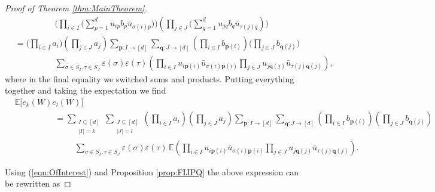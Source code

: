 \documentclass[11pt, a4paper, oneside, reqno]{amsart}
\theoremstyle{remark}
\theoremstyle{definition}
\numberwithin{equation}{section}
\begin{document}
\begin{proof}[Proof of Theorem \ref{thm:MainTheorem}]
\begin{align*}
	 & \hspace{2cm} \Big(\prod_{i \in I}\Big(\sum_{p=1}^d u_{ip}b_p\bar{u}_{\sigma(i)p}\Big)\Big)(\prod_{j \in J}\Big(\sum_{q=1}^d u_{jq}b_q\bar{u}_{\tau(j)q})\Big)                                                     \\
	 & = \Big(\prod_{i\in I}a_{i}\Big)(\prod_{j\in J}a_{j})\sum_{\mathbf{p}: I \to [d]}\sum_{\mathbf{q}: J \to [d]}(\prod_{i \in I}b_{\mathbf{p}(i)})\Big(\prod_{j \in J}b_{\mathbf{q}(j)}\Big)                        \\
	 & \hspace{2cm} \sum_{\sigma \in S_I, \tau \in S_J} \varepsilon(\sigma)\varepsilon(\tau) (\prod_{i \in I} u_{i\mathbf{p}(i)}\bar{u}_{\sigma(i)\mathbf{p}(i)}\prod_{j \in J}u_{j\mathbf{q}(j)}\bar{u}_{\tau(j)\mathbf{q}(j)}),
\end{align*}
where in the final equality we switched sums and products. Putting everything together and taking the expectation we find
\begin{align*}
	 & \mathbb{E}\bigl[e_k(W) e_{l}(W)\bigr] \nonumber                                                                                                                                                                    \\
	 & \hspace{2cm}= \sum_{\substack{I \subseteq [d]                                                                                                                                                                                                    \\ |I| = k}} \sum_{\substack{J \subseteq [d]\\ |J| = l}} (\prod_{i\in I}a_{i})(\prod_{j\in J}a_{j}) \sum_{\mathbf{p}: I \to [d]}\sum_{\mathbf{q}: J \to [d]}(\prod_{i \in I}b_{\mathbf{p}(i)})(\prod_{j \in J}b_{\mathbf{q}(j)}) \nonumber\\
	 & \hspace{3cm} \sum_{\sigma \in S_I, \tau \in S_J} \varepsilon(\sigma)\varepsilon(\tau)\, \mathbb{E}(\prod_{i \in I} u_{i\mathbf{p}(i)}\bar{u}_{\sigma(i)\mathbf{p}(i)}\prod_{j \in J}u_{j\mathbf{q}(j)}\bar{u}_{\tau(j)\mathbf{q}(j)}).
\end{align*}

Using (\ref{eqn:OfInterest}) and Proposition \ref{prop:FIJPQ} the above expression can be rewritten as


\end{proof}
\end{document}
